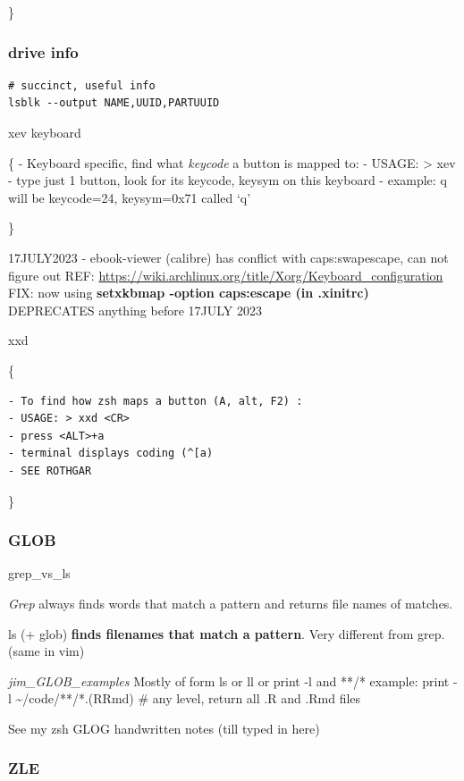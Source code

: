 \documentclass[
  letterpaper,
  DIV=11,
  numbers=noendperiod]{scrartcl}
\begin{document}
\}

\subsubsection{drive info}\label{drive-info}

\begin{verbatim}
# succinct, useful info
lsblk --output NAME,UUID,PARTUUID
\end{verbatim}

xev keyboard

\{ - Keyboard specific, find what \emph{keycode} a button is mapped to:
- USAGE: \textgreater{} xev - type just 1 button, look for its keycode,
keysym on this keyboard - example: q will be keycode=24, keysym=0x71
called `q'

\}

17JULY2023 - ebook-viewer (calibre) has conflict with caps:swapescape,
can not figure out REF:
\url{https://wiki.archlinux.org/title/Xorg/Keyboard_configuration} FIX:
now using \textbf{setxkbmap -option caps:escape (in .xinitrc) }
DEPRECATES anything before 17JULY 2023

xxd

\{

\begin{verbatim}
- To find how zsh maps a button (A, alt, F2) :  
- USAGE: > xxd <CR>
- press <ALT>+a
- terminal displays coding (^[a)
- SEE ROTHGAR
\end{verbatim}

\}

\subsubsection{GLOB}\label{glob}

grep\_vs\_ls

\emph{Grep} always finds words that match a pattern and returns file
names of matches.

ls (+ glob) \textbf{finds filenames that match a pattern}. Very
different from grep. (same in vim)

\emph{jim\_GLOB\_examples} Mostly of form ls or ll or print -l and **/*
example: print -l \textasciitilde/code/**/*.(R\textbar Rmd) \# any
level, return all .R and .Rmd files

See my zsh GLOG handwritten notes (till typed in here)

\subsubsection{ZLE}\label{zle}
\end{document}
